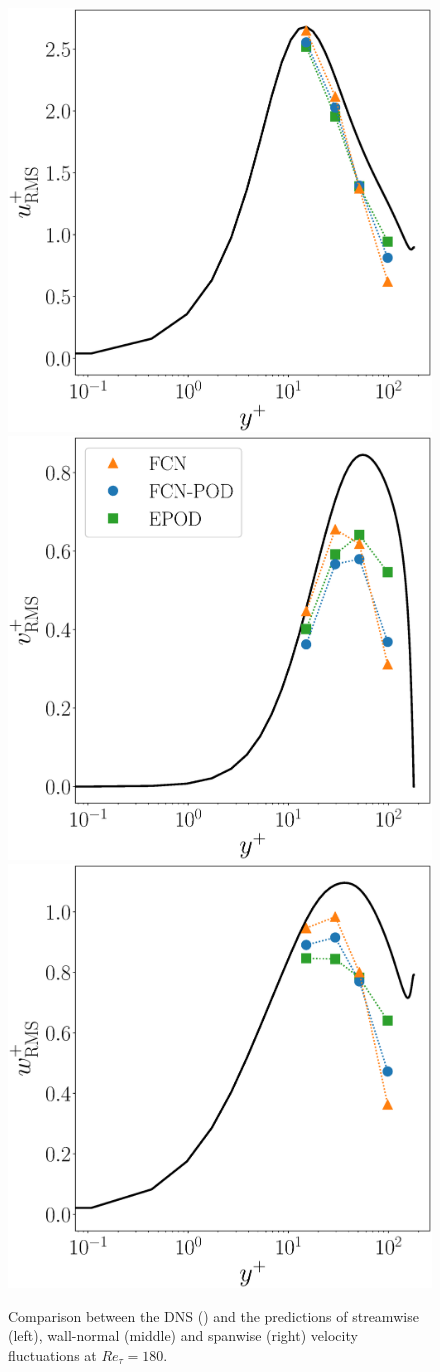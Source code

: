\begin{figure}
\begin{center}
\includegraphics[width=.32\columnwidth]{Ret180/uu180.eps}
\includegraphics[width=.32\columnwidth]{Ret180/vv180.eps}
\includegraphics[width=.32\columnwidth]{Ret180/ww180.eps}
\end{center}
\caption{\label{fig:stats180} Comparison between the DNS (\full) and the predictions of streamwise (left),
 wall-normal (middle) and spanwise (right) velocity
fluctuations at $Re_{\tau} = 180$.}
\end{figure}

